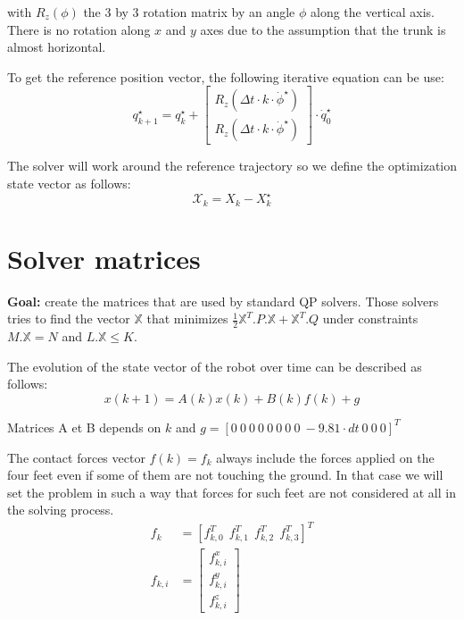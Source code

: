 \documentclass[a4paper,11pt]{article}
\begin{document}
with $R_z(\phi)$ the 3 by 3 rotation matrix by an angle $\phi$ along the vertical axis. There is no rotation along $x$ and $y$ axes due to the assumption that the trunk is almost horizontal.


To get the reference position vector, the following iterative equation can be use:
\begin{equation} q_{k+1}^\star = q_k^\star + \begin{bmatrix} R_z(\Delta t \cdot k \cdot \dot \phi^\star) \\ R_z(\Delta t \cdot k \cdot \dot \phi^\star) \end{bmatrix} \cdot \dot q_0^\star \end{equation}

The solver will work around the reference trajectory so we define the optimization state vector as follows:
\begin{equation}\mathcal{X}_k = X_k - X_k^\star \end{equation}

\newpage

\section*{Solver matrices}

\textbf{Goal:} create the matrices that are used by standard QP solvers. Those solvers tries to find the vector $\mathbb{X}$ that minimizes $\frac{1}{2}\mathbb{X}^T.P.\mathbb{X} + \mathbb{X}^T.Q$ under constraints $M.\mathbb{X} = N$ and $L.\mathbb{X} \leq K$.

The evolution of the state vector of the robot over time can be described as follows:
\begin{equation}
x(k+1) = A(k) x(k) + B(k) f(k) + g
\end{equation}

Matrices A et B depends on $k$ and $g = [0 ~ 0 ~ 0 ~ 0 ~ 0 ~ 0 ~ 0 ~ 0 ~ -9.81 \cdot dt~ 0 ~ 0 ~ 0]^T$

The contact forces vector $f(k) = f_k$ always include the forces applied on the four feet even if some of them are not touching the ground. In that case we will set the problem in such a way that forces for such feet are not considered at all in the solving process.
\begin{align}
f_k &= [f_{k,0}^T ~~ f_{k,1}^T ~~ f_{k,2}^T ~~ f_{k,3}^T]^T \\
f_{k,i} &= \begin{bmatrix} f^x_{k,i} \\ f^y_{k,i} \\ f^z_{k,i} \end{bmatrix}
\end{align}
\end{document}
